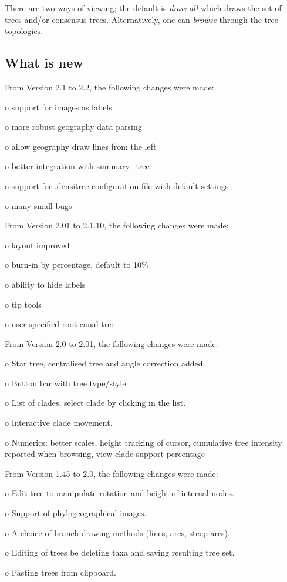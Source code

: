 \documentclass{article}
\begin{document}
There are two ways of viewing; the default is {\em draw all} which draws the set 
of trees and/or consensus trees. Alternatively, one can {\em browse} through the
tree topologies.

\subsection{What is new \label{ssec.new}}
From Version 2.1 to 2.2, the following changes were made:

o support for images as labels

o more robust geography data parsing

o allow geography draw lines from the left

o better integration with summary\_tree

o support for .densitree configuration file with default settings

o many small bugs

From Version 2.01 to 2.1.10, the following changes were made:

o layout improved

o burn-in by percentage, default to 10\%

o ability to hide labels

o tip tools

o user specified root canal tree

From Version 2.0 to 2.01, the following changes were made:

o Star tree, centralised tree and angle correction added.

o Button bar with tree type/style.

o List of clades, select clade by clicking in the list.

o Interactive clade movement.

o Numerics: better scales, height tracking of cursor, cumulative tree intensity reported when browsing, view clade support percentage

From Version 1.45 to 2.0, the following changes were made:

o Edit tree to manipulate rotation and height of internal nodes.

o Support of phylogeographical images.

o A choice of branch drawing methods (lines, arcs, steep arcs).

o Editing of trees be deleting taxa and saving resulting tree set.

o Pasting trees from clipboard.
\end{document}

